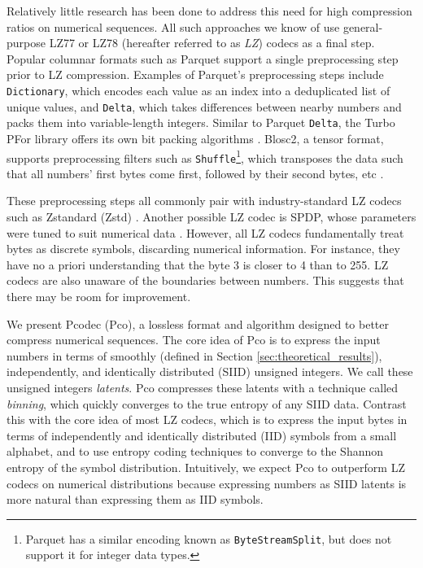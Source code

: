 \documentclass[letterpaper]{article}
\begin{document}
Relatively little research has been done to address this need for high compression ratios on numerical sequences.
All such approaches we know of use general-purpose LZ77 \cite{lz77} or LZ78 \cite{lz78} (hereafter referred to as \emph{LZ}) codecs as a final step.
Popular columnar formats such as Parquet \cite{parquet_encodings} support a single preprocessing step prior to LZ compression.
Examples of Parquet's preprocessing steps include \texttt{Dictionary}, which encodes each value as an index into a deduplicated list of unique values, and \texttt{Delta}, which takes differences between nearby numbers and packs them into variable-length integers.
Similar to Parquet \texttt{Delta}, the Turbo PFor library offers its own bit packing algorithms \cite{turbo_pfor}.
Blosc2, a tensor format, supports preprocessing filters such as \texttt{Shuffle}\footnote{Parquet has a similar encoding known as \texttt{ByteStreamSplit}, but does not support it for integer data types.}, which transposes the data such that all numbers' first bytes come first, followed by their second bytes, etc \cite{blosc}.

These preprocessing steps all commonly pair with industry-standard LZ codecs such as Zstandard (Zstd) \cite{zstd}.
Another possible LZ codec is SPDP, whose parameters were tuned to suit numerical data \cite{spdp}.
However, all LZ codecs fundamentally treat bytes as discrete symbols, discarding numerical information.
For instance, they have no a priori understanding that the byte 3 is closer to 4 than to 255.
LZ codecs are also unaware of the boundaries between numbers.
This suggests that there may be room for improvement.

We present Pcodec (Pco), a lossless format and algorithm designed to better compress numerical sequences.
The core idea of Pco is to express the input numbers in terms of smoothly (defined in Section \ref{sec:theoretical_results}), independently, and identically distributed (SIID) unsigned integers.
We call these unsigned integers \emph{latents}.
Pco compresses these latents with a technique called \emph{binning}, which quickly converges to the true entropy of any SIID data.
Contrast this with the core idea of most LZ codecs, which is to express the input bytes in terms of independently and identically distributed (IID) symbols from a small alphabet, and to use entropy coding techniques to converge to the Shannon entropy of the symbol distribution.
Intuitively, we expect Pco to outperform LZ codecs on numerical distributions because expressing numbers as SIID latents is more natural than expressing them as IID symbols.
\end{document}
